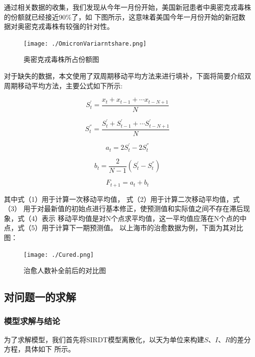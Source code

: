 \documentclass[bwprint]{gmcmthesis}
\numberwithin{figure}{section}
\begin{document}
\par 通过相关数据的收集，我们发现从今年一月份开始，美国新冠患者中奥密克戎毒株的份额就已经接近90$\%$了，如
下图所示，这意味着美国今年一月份开始的新冠数据对奥密克戎毒株有较强的针对性。

\begin{figure}[!h]
    \centering
    \texttt{[image: ./OmicronVariarntshare.png]}
    \caption{奥密克戎毒株所占份额图}
    \label{fig1}
\end{figure}

\par 对于缺失的数据，本文使用了双周期移动平均方法来进行填补，下面将简要介绍双周期移动平均方法，主要公式如下所示:

\begin{equation}
    S_{t}^{'}=\dfrac{x_t+x_{t-1}+\cdots x_{t-N+1}}{N}
\end{equation}

\begin{equation}
    S_{t}^{''}=\dfrac{S_{t}^{'}+S_{t-1}^{'}+\cdots S_{t-N+1}^{'}}{N}
\end{equation}

\begin{equation}
    a_t=2S_{t}^{'}-2S_{t}^{''}
\end{equation}

\begin{equation}
    b_t=\dfrac{2}{N-1}\left( S_{t}^{'}-S_{t}^{''} \right) 
\end{equation}

\begin{equation}
    F_{t+1}=a_t+b_t
\end{equation}

\par 其中式（1）用于计算一次移动平均值， 式（2）用于计算二次移动平均值，式（3）
用于对最新值的初始点进行基本修正，使预测值和实际值之间不存在滞后现象，式（4）表示
移动平均值是对N个点求平均值，这一平均值应落在N个点的中点，式（5）用于计算下一期预测值。
以上海市的治愈数据为例，下面为其对比图：

\begin{figure}[!h]
    \centering
    \texttt{[image: ./Cured.png]}
    \caption{治愈人数补全前后的对比图}
    \label{fig1}
\end{figure}

\subsection{对问题一的求解}
\subsubsection{模型求解与结论}
\par 为了求解模型，我们首先将SIRDT模型离散化，以天为单位来构建$S$、$I$、$R$的差分方程，具体如下
所示。
\end{document}
